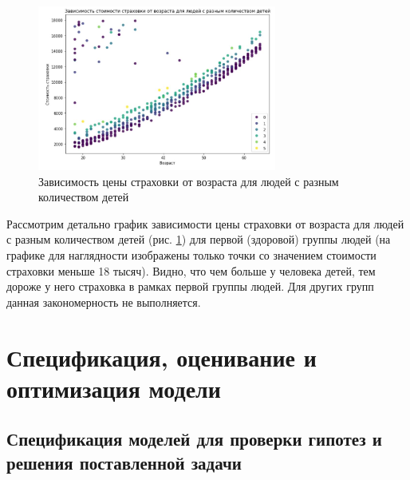\documentclass[a4paper,12pt]{article}
\begin{document}
\begin{figure}[H]
	\includegraphics[width=0.7\textwidth]{../[graphics]/age-charges-childern.jpg}
	\centering
	\caption{Зависимость цены страховки от возраста для людей с разным количеством детей}
	\label{fig:age-charges-children}
\end{figure}

Рассмотрим детально график зависимости цены страховки от возраста для людей с разным количеством детей (рис. \ref{fig:age-charges-children}) для первой (здоровой) группы людей (на графике для наглядности изображены только точки со значением стоимости страховки меньше 18 тысяч). Видно, что чем больше у человека детей, тем дороже у него страховка в рамках первой группы людей. Для других групп данная закономерность не выполняется.

\section{Спецификация, оценивание и оптимизация модели}

\subsection{Спецификация моделей для проверки гипотез и решения поставленной задачи}






\end{document}
